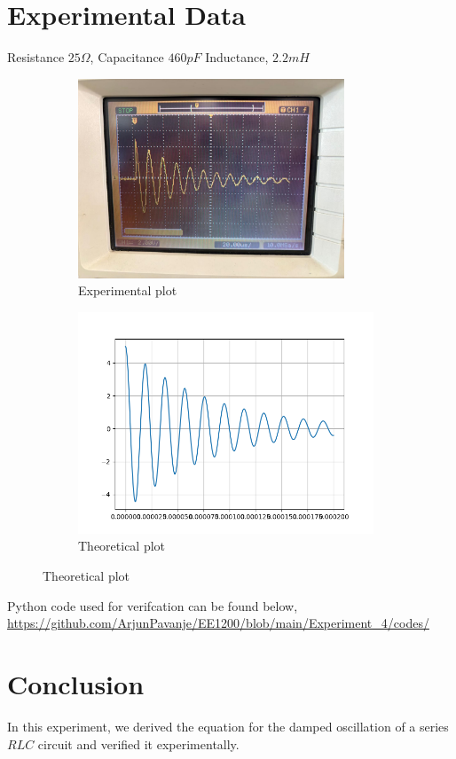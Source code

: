\documentclass[a4paper,12pt]{article}
\begin{document}
\section{Experimental Data}
Resistance $25\Omega$,\newline
Capacitance $460pF$\newline
Inductance, $2.2mH$
\begin{figure}[h!]
	\begin{subfigure}[b]{100pt}
		\caption{Experimental plot}
		\includegraphics[width = 225pt]{figs/fig1.png}
	\end{subfigure}
	\hspace{110pt}
	\begin{subfigure}[b]{100pt}
		\caption{Theoretical plot}
		\includegraphics[width = 250pt]{figs/fig2.png}
	\end{subfigure}
\end{figure}
\newline Python code used for verifcation can be found below,
\newline
\url{https://github.com/ArjunPavanje/EE1200/blob/main/Experiment_4/codes/}
\section{Conclusion}
In this experiment, we derived the equation for the damped oscillation of a series $RLC$ circuit and verified it experimentally.
\end{document}
